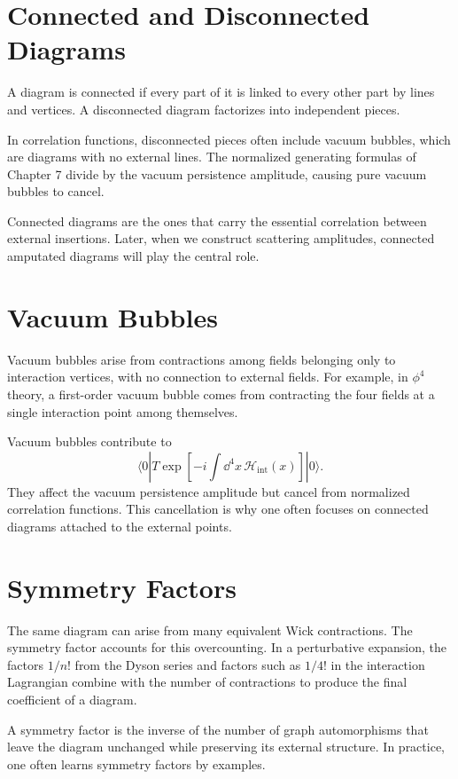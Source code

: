 \section{Connected and Disconnected Diagrams}

A diagram is connected if every part of it is linked to every other part by
lines and vertices. A disconnected diagram factorizes into independent pieces.

In correlation functions, disconnected pieces often include vacuum bubbles,
which are diagrams with no external lines. The normalized generating formulas of
Chapter 7 divide by the vacuum persistence amplitude, causing pure vacuum
bubbles to cancel.

Connected diagrams are the ones that carry the essential correlation between
external insertions. Later, when we construct scattering amplitudes, connected
amputated diagrams will play the central role.

\section{Vacuum Bubbles}

Vacuum bubbles arise from contractions among fields belonging only to interaction
vertices, with no connection to external fields. For example, in \(\phi^4\)
theory, a first-order vacuum bubble comes from contracting the four fields at a
single interaction point among themselves.

Vacuum bubbles contribute to
\[
    \langle0|T\exp\left[-i\int\dd^4x\,\mathcal{H}_{\mathrm{int}}(x)\right]|0\rangle.
\]
They affect the vacuum persistence amplitude but cancel from normalized
correlation functions. This cancellation is why one often focuses on connected
diagrams attached to the external points.

\section{Symmetry Factors}

The same diagram can arise from many equivalent Wick contractions. The symmetry
factor accounts for this overcounting. In a perturbative expansion, the factors
\(1/n!\) from the Dyson series and factors such as \(1/4!\) in the interaction
Lagrangian combine with the number of contractions to produce the final
coefficient of a diagram.

A symmetry factor is the inverse of the number of graph automorphisms that leave
the diagram unchanged while preserving its external structure. In practice, one
often learns symmetry factors by examples.

